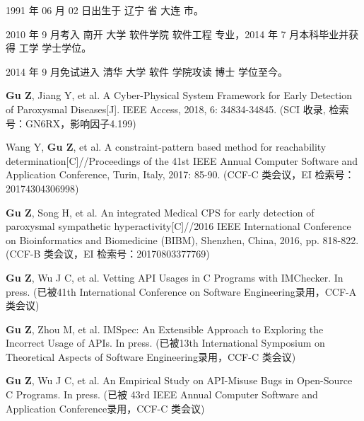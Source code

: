 \begin{resume}


  1991 年 06 月 02 日出生于 辽宁 省 大连 市。

  2010 年 9 月考入 南开 大学 软件学院  软件工程 专业，2014 年 7 月本科毕业并获得 工学 学士学位。

  2014 年 9 月免试进入 清华 大学 软件 学院攻读 博士 学位至今。


  \begin{publications}
    \item \textbf{Gu Z}, Jiang Y, et al. A Cyber-Physical System Framework for Early Detection of Paroxysmal Diseases[J]. IEEE Access, 2018, 6: 34834-34845. (SCI 收录, 检索号：GN6RX，影响因子4.199)
    \item Wang Y, \textbf{Gu Z}, et al. A constraint-pattern based method for reachability determination[C]//Proceedings of the 41st IEEE Annual Computer Software and Application Conference, Turin, Italy, 2017: 85-90. (CCF-C 类会议，EI 检索号：20174304306998)
    \item \textbf{Gu Z}, Song H, et al. An integrated Medical CPS for early detection of paroxysmal sympathetic hyperactivity[C]//2016 IEEE International Conference on Bioinformatics and Biomedicine (BIBM), Shenzhen, China, 2016, pp. 818-822. (CCF-B 类会议，EI 检索号：20170803377769)
  \end{publications}

  \begin{publications}[before=\publicationskip,after=\publicationskip]
    \item \textbf{Gu Z}, Wu J C, et al. Vetting API Usages in C Programs with IMChecker. In press. (已被41th International Conference on Software Engineering录用，CCF-A 类会议)
    \item \textbf{Gu Z}, Zhou M, et al. IMSpec: An Extensible Approach to Exploring the Incorrect Usage of APIs. In press. (已被13th International Symposium on Theoretical Aspects of Software Engineering录用，CCF-C 类会议)
    \item \textbf{Gu Z}, Wu J C, et al. An Empirical Study on API-Misuse Bugs in Open-Source C Programs. In press. (已被 43rd IEEE Annual Computer Software and Application Conference录用，CCF-C 类会议)
  \end{publications}



\end{resume}
